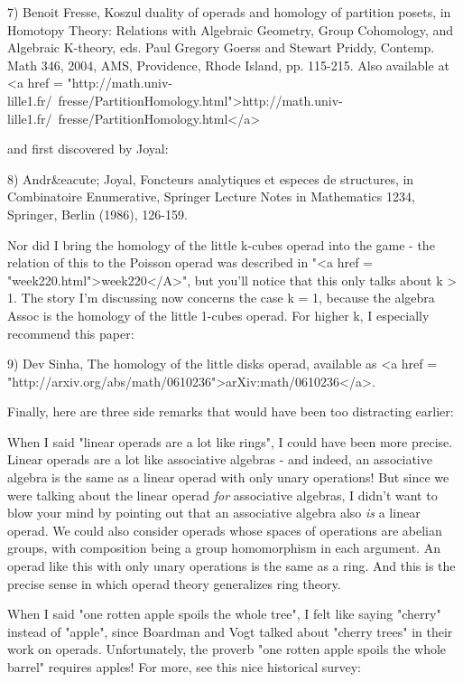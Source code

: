 7) Benoit Fresse, Koszul duality of operads and homology of
partition posets, in Homotopy Theory: Relations with Algebraic 
Geometry, Group Cohomology, and Algebraic K-theory, eds. 
Paul Gregory Goerss and Stewart Priddy, Contemp. Math 346, 
2004, AMS, Providence, Rhode Island, pp. 115-215.
Also available at <a href = "http://math.univ-lille1.fr/~fresse/PartitionHomology.html">http://math.univ-lille1.fr/~fresse/PartitionHomology.html</a>

and first discovered by Joyal:

8) Andr&eacute; Joyal, Foncteurs analytiques et especes de structures, in 
Combinatoire Enumerative, Springer Lecture Notes in Mathematics 1234, 
Springer, Berlin (1986), 126-159. 

Nor did I bring the homology of the little k-cubes operad into the
game - the relation of this to the Poisson operad was described in
"<a href = "week220.html">week220</A>", but you'll notice
that this only talks about k > 1.  The story I'm discussing now
concerns the case k = 1, because the algebra Assoc is the homology of
the little 1-cubes operad.  For higher k, I especially recommend this
paper:

9) Dev Sinha, The homology of the little disks operad, available as 
<a href = "http://arxiv.org/abs/math/0610236">arXiv:math/0610236</a>.

Finally, here are three side remarks that would have been too
distracting earlier:

When I said "linear operads are a lot like rings", I could have
been more precise.  Linear operads are a lot like associative algebras -
and indeed, an associative algebra is the same as a linear operad with
only unary operations!  But since we were talking about the linear
operad \emph{for} associative algebras, I didn't want to blow your mind by
pointing out that an associative algebra also \emph{is} a linear operad.
We could also consider operads whose spaces of operations are abelian
groups, with composition being a group homomorphism in each
argument.  An operad like this with only unary operations is the 
same as a ring.  And this is the precise sense in which operad theory
generalizes ring theory.

When I said "one rotten apple spoils the whole tree", I felt
like saying "cherry" instead of "apple", since
Boardman and Vogt talked about "cherry trees" in their work
on operads.  Unfortunately, the proverb "one rotten apple spoils
the whole barrel" requires apples!  For more, see this nice
historical survey:

